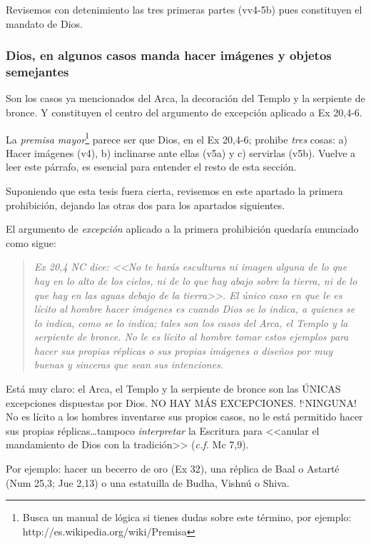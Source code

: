 \documentclass{article}
\begin{document}
\noindent
Revisemos con detenimiento las tres primeras partes (vv4-5b) pues constituyen el mandato de Dios.

\subsubsection{Dios, en algunos casos manda hacer im\'agenes y objetos semejantes}

Son los casos ya mencionados del Arca, la decoraci\'on del Templo y la serpiente de bronce. Y constituyen el centro del argumento de excepci\'on aplicado a Ex 20,4-6.

La \emph{premisa mayor}\footnote{Busca un manual de l\'ogica si tienes dudas sobre este t\'ermino, por ejemplo: http://es.wikipedia.org/wiki/Premisa} parece ser que Dios, en el Ex 20,4-6; prohibe \emph{tres} cosas: a) Hacer im\'agenes (v4), b) inclinarse ante ellas (v5a) y c) servirlas (v5b). Vuelve a leer este p\'arrafo, es esencial para entender el resto de esta secci\'on.

Suponiendo que esta tesis fuera cierta, revisemos en este apartado la primera prohibici\'on, dejando las otras dos para los apartados siguientes.

El argumento de \emph{excepci\'on} aplicado a la primera prohibici\'on quedar\'{i}a enunciado como sigue:

\begin{quote}
\emph{Ex 20,4 NC dice: <<No te har\'as esculturas ni imagen alguna de lo que hay en lo alto de los cielos, ni de lo que hay abajo sobre la tierra, ni de lo que hay en las aguas debajo de la tierra>>. El \'unico caso en que le es l\'{i}cito al hombre hacer im\'agenes es cuando Dios se lo indica, a quienes se lo indica, como se lo indica; tales son los casos del Arca, el Templo y la serpiente de bronce. No le es l\'{i}cito al hombre tomar estos ejemplos para hacer sus propias r\'eplicas o sus propias im\'agenes o dise\~nos por muy buenas y sinceras que sean sus intenciones.}
\end{quote}

\noindent
Est\'a muy claro: el Arca, el Templo y la serpiente de bronce son las \'UNICAS excepciones dispuestas por Dios. NO HAY M\'AS EXCEPCIONES. !`NINGUNA! No es l\'{i}cito a los hombres inventarse sus propios casos, no le est\'a permitido hacer sus propias r\'eplicas\ldots tampoco \emph{interpretar} la Escritura para <<anular el mandamiento de Dios con la tradici\'on>> (\emph{c.f.} Mc 7,9).

Por ejemplo: hacer un becerro de oro (Ex 32), una r\'eplica de Baal o Astart\'e (Num 25,3; Jue 2,13) o una estatuilla de Budha, Vishn\'u o Shiva.
\end{document}
